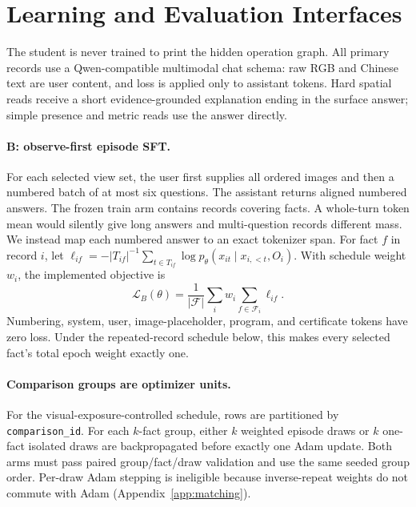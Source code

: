 \section{Learning and Evaluation Interfaces}
\label{sec:training}

The student is never trained to print the hidden operation graph.  All primary
records use a Qwen-compatible multimodal chat schema: raw RGB and Chinese text
are user content, and loss is applied only to assistant tokens.  Hard spatial
reads receive a short evidence-grounded explanation ending in the surface
answer; simple presence and metric reads use the answer directly.

\paragraph{B: observe-first episode SFT.}
For each selected view set, the user first supplies all ordered images and then
a numbered batch of at most six questions.  The assistant returns aligned
numbered answers.  The frozen train arm contains \EpiEpisodeRecords{} records
covering \EpiSupervisedFacts{} facts.  A whole-turn token mean would silently
give long answers and multi-question records different mass.  We instead map
each numbered answer to an exact tokenizer span.  For fact $f$ in record $i$,
let
\(
\ell_{if}=-|T_{if}|^{-1}\sum_{t\in T_{if}}
\log p_\theta(x_{it}\mid x_{i,<t},O_i)
\).
With schedule weight $w_i$, the implemented objective is
\begin{equation}
  \mathcal L_B(\theta)=\frac{1}{|\mathcal F|}
  \sum_i w_i\sum_{f\in\mathcal F_i}\ell_{if}.
  \label{eq:sft}
\end{equation}
Numbering, system, user, image-placeholder, program, and certificate tokens
have zero loss.  Under the repeated-record schedule below, this makes every
selected fact's total epoch weight exactly one.

\paragraph{Comparison groups are optimizer units.}
For the visual-exposure-controlled schedule, rows are partitioned by
\texttt{comparison\_id}.  For each $k$-fact group, either $k$ weighted episode
draws or $k$ one-fact isolated draws are backpropagated before exactly one Adam
update.  Both arms must pass paired group/fact/draw validation and use the same
seeded group order.  Per-draw Adam stepping is ineligible because inverse-repeat
weights do not commute with Adam (Appendix~\ref{app:matching}).

